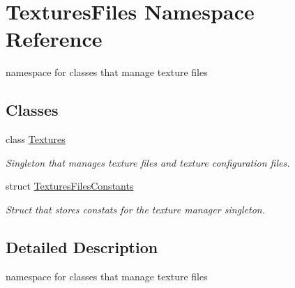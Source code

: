 \hypertarget{namespace_textures_files}{}\section{Textures\+Files Namespace Reference}
\label{namespace_textures_files}


namespace for classes that manage texture files  


\subsection*{Classes}
\begin{DoxyCompactItemize}
\item 
class \mbox{\hyperlink{class_textures_files_1_1_textures}{Textures}}
\begin{DoxyCompactList}\small\item\em Singleton that manages texture files and texture configuration files. \end{DoxyCompactList}\item 
struct \mbox{\hyperlink{struct_textures_files_1_1_textures_files_constants}{Textures\+Files\+Constants}}
\begin{DoxyCompactList}\small\item\em Struct that stores constats for the texture manager singleton. \end{DoxyCompactList}\end{DoxyCompactItemize}


\subsection{Detailed Description}
namespace for classes that manage texture files 